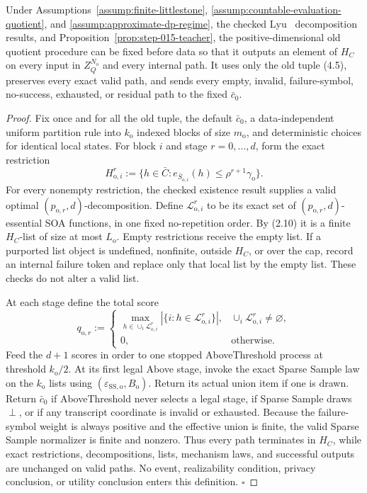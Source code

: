 \begin{proposition}\label{prop:step-015-total}
Under Assumptions~\ref{assump:finite-littlestone},
\ref{assump:countable-evaluation-quotient}, and
\ref{assump:approximate-dp-regime}, the checked Lyu~\citep{lyu2025} decomposition results,
and Proposition~\ref{prop:step-015-teacher}, the positive-dimensional old
quotient procedure can be fixed before data so that it outputs an element
of \(H_C\) on every input in \(Z_Q^{N_{\mathrm o}}\) and every internal
path. It uses only the old tuple (4.5), preserves every exact valid
path, and sends every empty, invalid, failure-symbol, no-success, exhausted,
or residual path to the fixed \(\bar c_0\).


\end{proposition}

\begin{proof}
Fix once and for all the old tuple, the default \(\bar c_0\), a
data-independent uniform partition rule into \(k_{\mathrm o}\) indexed
blocks of size \(m_{\mathrm o}\), and deterministic choices for identical
local states. For block \(i\) and stage \(r=0,\ldots,d\), form the exact
restriction
\[
H_{\mathrm o,i}^r
:=\{h\in\bar C:
e_{\bar S_{\mathrm o,i}}(h)
\le\rho^{r+1}\gamma_{\mathrm o}\}.
\tag{5.1}
\]
For every nonempty restriction, the checked existence result supplies a
valid optimal \((p_{\mathrm o,r},d)\)-decomposition. Define
\(\mathcal L_{\mathrm o,i}^r\) to be its exact set of
\((p_{\mathrm o,r},d)\)-essential SOA functions, in one fixed
no-repetition order. By (2.10) it is a finite \(H_C\)-list of size at most
\(L_{\mathrm o}\). Empty restrictions receive the empty list. If a
  purported list object is undefined, nonfinite, outside \(H_C\), or over
the cap, record an internal failure token and replace only that local list
by the empty list. These checks do not alter a valid list.

At each stage define the total score
\[
q_{\mathrm o,r}:=
\begin{cases}
\displaystyle\max_{h\in\cup_i\mathcal L_{\mathrm o,i}^r}
|\{i:h\in\mathcal L_{\mathrm o,i}^r\}|,&
\cup_i\mathcal L_{\mathrm o,i}^r\ne\varnothing,\\
0,&\text{otherwise}.
\end{cases}
\tag{5.2}
\]
Feed the \(d+1\) scores in order to one stopped AboveThreshold process at
threshold \(k_{\mathrm o}/2\). At its first legal Above stage, invoke the
exact Sparse Sample law on the \(k_{\mathrm o}\) lists using
\((\varepsilon_{\mathrm{SS,o}},B_{\mathrm o})\). Return its actual union
item if one is drawn. Return \(\bar c_0\) if AboveThreshold never selects a
legal stage, if Sparse Sample draws \(\perp\), or if any transcript
coordinate is invalid or exhausted. Because the failure-symbol weight is
always positive and the effective union is finite, the valid Sparse
Sample normalizer is finite and nonzero. Thus every path terminates in
\(H_C\), while exact restrictions, decompositions, lists, mechanism laws,
and successful outputs are unchanged on valid paths. No event,
realizability condition, privacy conclusion, or utility conclusion enters
this definition. \(\square\)


\end{proof}

